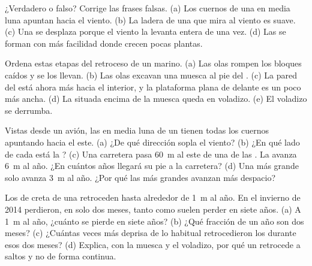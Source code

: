 \begin{exercise}[$\star$]\label{exo:g9:landforms:3}
¿Verdadero o falso? Corrige las frases falsas. (a) Los cuernos de una 
en media luna apuntan hacia el viento. (b) La ladera de una  que mira
al viento es suave. (c) Una  se desplaza porque el viento la levanta
entera de una vez. (d) Las  se forman con más facilidad donde crecen
pocas plantas.
\end{exercise}

\begin{exercise}[$\star$]\label{exo:g9:landforms:4}
Ordena estas etapas del retroceso de un  marino. (a) Las olas
rompen los bloques caídos y se los llevan. (b) Las olas excavan una muesca
al pie del . (c) La pared del  está ahora más hacia el
interior, y la plataforma plana de delante es un poco más ancha. (d) La
 situada encima de la muesca queda en voladizo. (e) El voladizo se
derrumba.
\end{exercise}

\begin{exercise}[$\star\star$]\label{exo:g9:landforms:5}
Vistas desde un avión, las  en media luna de un  tienen todas
los cuernos apuntando hacia el este. (a) ¿De qué dirección sopla el
viento? (b) ¿En qué lado de cada  está la ? (c) Una
carretera pasa \qty{60}{m} al este de una de las . La  avanza
\qty{6}{m} al año. ¿En cuántos años llegará su pie a la carretera? (d) Una
 más grande solo avanza \qty{3}{m} al año. ¿Por qué las  más
grandes avanzan más despacio?
\end{exercise}

\begin{exercise}[$\star\star$]\label{exo:g9:landforms:6}
Los  de creta de una  retroceden hasta alrededor de
\qty{1}{m} al año. En el invierno de 2014 perdieron, en solo dos meses,
tanto como suelen perder en siete años. (a) A \qty{1}{m} al año, ¿cuánto
se pierde en siete años? (b) ¿Qué fracción de un año son dos meses?
(c) ¿Cuántas veces más deprisa de lo habitual retrocedieron los
 durante esos dos meses? (d) Explica, con la muesca y el
voladizo, por qué un  retrocede a saltos y no de forma continua.
\end{exercise}

